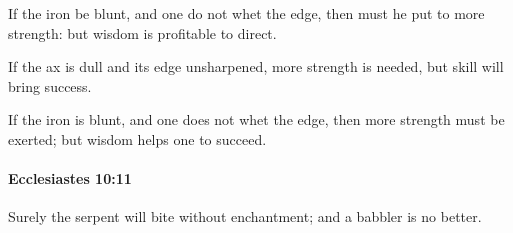 			\begin{versebox}
					\item[BHS] 
					\item[LXX] 
					\item[ASV] If the iron be blunt, and one do not whet the edge, then must he put to more strength: but wisdom is profitable to direct.
					\item[NIV] If the ax is dull and its edge unsharpened, more strength is needed, but skill will bring success.
					\item[NRSV] If the iron is blunt, and one does not whet the edge, then more strength must be exerted; but wisdom helps one to succeed.
			\end{versebox}

		\paragraph{Ecclesiastes 10:11} %
			\label{ECCLESIASTES-10-11}

			Surely the serpent will bite without enchantment; and a babbler is no better.

